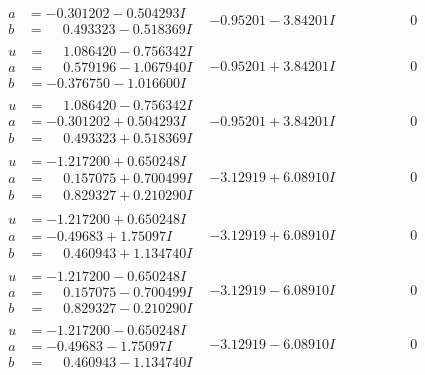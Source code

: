 \documentclass[1p]{elsarticle_modified}
\theoremstyle{definition}
\begin{document}
$$\begin{array}{c|c|c}
\begin{aligned}
a &= -0.301202 - 0.504293 I \\
b &= \phantom{-}0.493323 - 0.518369 I\end{aligned}
 & -0.95201 - 3.84201 I & \phantom{-0.000000 } 0 \\ \hline\begin{aligned}
u &= \phantom{-}1.086420 - 0.756342 I \\
a &= \phantom{-}0.579196 - 1.067940 I \\
b &= -0.376750 - 1.016600 I\end{aligned}
 & -0.95201 + 3.84201 I & \phantom{-0.000000 } 0 \\ \hline\begin{aligned}
u &= \phantom{-}1.086420 - 0.756342 I \\
a &= -0.301202 + 0.504293 I \\
b &= \phantom{-}0.493323 + 0.518369 I\end{aligned}
 & -0.95201 + 3.84201 I & \phantom{-0.000000 } 0 \\ \hline\begin{aligned}
u &= -1.217200 + 0.650248 I \\
a &= \phantom{-}0.157075 + 0.700499 I \\
b &= \phantom{-}0.829327 + 0.210290 I\end{aligned}
 & -3.12919 + 6.08910 I & \phantom{-0.000000 } 0 \\ \hline\begin{aligned}
u &= -1.217200 + 0.650248 I \\
a &= -0.49683 + 1.75097 I \\
b &= \phantom{-}0.460943 + 1.134740 I\end{aligned}
 & -3.12919 + 6.08910 I & \phantom{-0.000000 } 0 \\ \hline\begin{aligned}
u &= -1.217200 - 0.650248 I \\
a &= \phantom{-}0.157075 - 0.700499 I \\
b &= \phantom{-}0.829327 - 0.210290 I\end{aligned}
 & -3.12919 - 6.08910 I & \phantom{-0.000000 } 0 \\ \hline\begin{aligned}
u &= -1.217200 - 0.650248 I \\
a &= -0.49683 - 1.75097 I \\
b &= \phantom{-}0.460943 - 1.134740 I\end{aligned}
 & -3.12919 - 6.08910 I & \phantom{-0.000000 } 0\\

\end{array}$$
\end{document}
